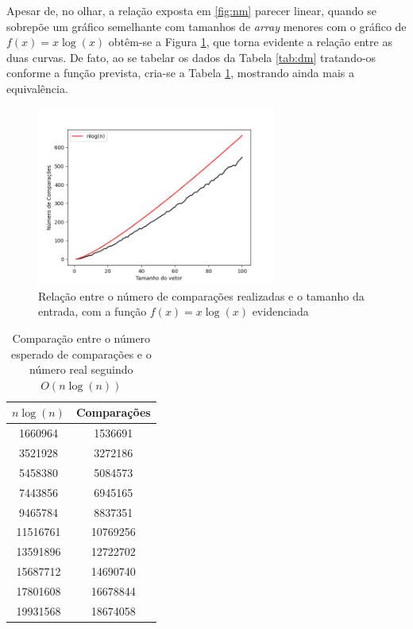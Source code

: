 \documentclass[12pt,a4paper,oneside]{article}
\begin{document}
\quad Apesar de, no olhar, a relação exposta em \ref{fig:nm} parecer linear, quando se sobrepõe um gráfico semelhante com tamanhos de \textit{array} menores com o gráfico de $f(x)=x\log{(x)}$ obtêm-se a Figura \ref{fig:mOK}, que torna evidente a relação entre as duas curvas. De fato, ao se tabelar os dados da Tabela \ref{tab:dm} tratando-os conforme a função prevista, cria-se a Tabela \ref{tab:mOK}, mostrando ainda mais a equivalência.

\begin{figure}[H]
\begin{center}
    \includegraphics[width=0.7\textwidth]{FigMnlogn.png} 
\end{center}
\caption{Relação entre o número de comparações realizadas e o tamanho da entrada, com a função $f(x)=x\log{(x)}$ evidenciada}
\label{fig:mOK}
\end{figure}

\begin{table}[H]
\caption{Comparação entre o número esperado de comparações e o número real seguindo $O(n\log{(n)})$}
\label{tab:mOK}
\begin{center}
\begin{tabular}{|c c|}
\hline
$n\log{(n)}$ & Comparações \\
\hline
1660964 & 1536691\\
3521928 & 3272186\\
5458380 & 5084573\\
7443856 & 6945165\\
9465784 & 8837351\\
11516761 & 10769256\\
13591896 & 12722702\\
15687712 & 14690740\\
17801608 & 16678844\\
19931568 & 18674058\\
\hline
\end{tabular}
\end{center}
\end{table}
\end{document}
